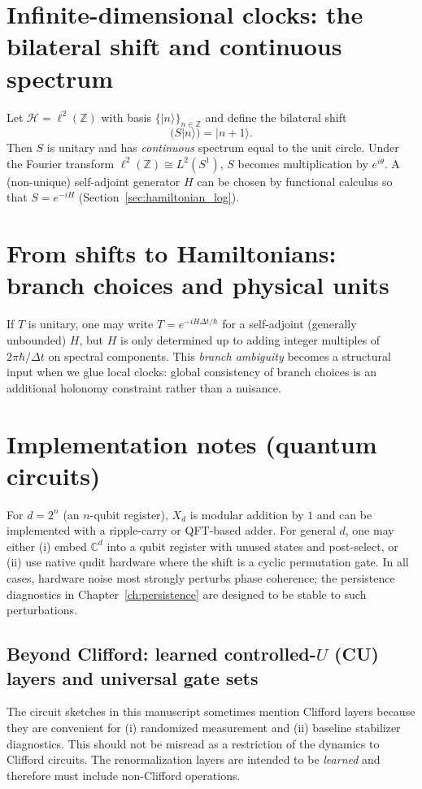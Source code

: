 \documentclass[11pt,oneside]{amsbook}
\numberwithin{equation}{section}
\theoremstyle{plain}
\theoremstyle{definition}
\theoremstyle{remark}
\newcommand{\Z}{\mathbb{Z}}
\newcommand{\C}{\mathbb{C}}
\newcommand{\cH}{\mathcal{H}}
\begin{document}
\section{Infinite-dimensional clocks: the bilateral shift and continuous spectrum}
Let $\cH=\ell^2(\Z)$ with basis $\{|n\rangle\}_{n\in\Z}$ and define the bilateral shift
\[
(S|n\rangle)=|n+1\rangle.
\]
Then $S$ is unitary and has \emph{continuous} spectrum equal to the unit circle.
Under the Fourier transform $\ell^2(\Z)\cong L^2(S^1)$, $S$ becomes multiplication by $e^{i\theta}$.
A (non-unique) self-adjoint generator $H$ can be chosen by functional calculus so that $S=e^{-iH}$ (Section~\ref{sec:hamiltonian_log}).

\section{From shifts to Hamiltonians: branch choices and physical units}
If $T$ is unitary, one may write $T=e^{-iH\Delta t/\hbar}$ for a self-adjoint (generally unbounded) $H$, but $H$ is only determined up to adding integer multiples of $2\pi\hbar/\Delta t$ on spectral components.
This \emph{branch ambiguity} becomes a structural input when we glue local clocks: global consistency of branch choices is an additional holonomy constraint rather than a nuisance.

\section{Implementation notes (quantum circuits)}
For $d=2^n$ (an $n$-qubit register), $X_d$ is modular addition by $1$ and can be implemented with a ripple-carry or QFT-based adder.
For general $d$, one may either (i) embed $\C^d$ into a qubit register with unused states and post-select, or (ii) use native qudit hardware where the shift is a cyclic permutation gate.
In all cases, hardware noise most strongly perturbs phase coherence; the persistence diagnostics in Chapter~\ref{ch:persistence} are designed to be stable to such perturbations.




\subsection{Beyond Clifford: learned controlled-$U$ (CU) layers and universal gate sets}
\label{sec:learned_CU_layers}

The circuit sketches in this manuscript sometimes mention Clifford layers because they are convenient for (i) randomized measurement and (ii) baseline stabilizer diagnostics.
This should not be misread as a restriction of the dynamics to Clifford circuits.
The renormalization layers are intended to be \emph{learned} and therefore must include non-Clifford operations.
\end{document}
